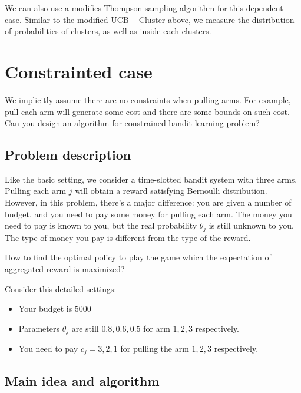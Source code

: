\documentclass[11pt]{article}
\providecommand{\tightlist}{%
      \setlength{\itemsep}{0pt}\setlength{\parskip}{0pt}}
\begin{document}
We can also use a modifies Thompson sampling algorithm for this
dependent-case. Similar to the modified \(\mathrm{UCB-Cluster}\) above, we
measure the distribution of probabilities of clusters, as well as inside
each clusters.
\pagebreak
    \hypertarget{constraint-sensitive-case}{%
\section{Constrainted case}\label{constraint-sensitive-case}}

We implicitly assume there are no constraints when pulling arms. For
example, pull each arm will generate some cost and there are some bounds
on such cost. Can you design an algorithm for constrained bandit
learning problem?

    \hypertarget{problem-description}{%
\subsection{Problem description}\label{problem-description}}

Like the basic setting, we consider a time-slotted bandit system with
three arms. Pulling each arm \(j\) will obtain a reward satisfying
Bernoulli distribution. However, in this problem, there's a major
difference: you are given a number of budget, and you need to pay some
money for pulling each arm. The money you need to pay is known to you,
but the real probability \(\theta_j\) is still unknown to you. The type
of money you pay is different from the type of the reward.

How to find the optimal policy to play the game which the expectation of
aggregated reward is maximized?

Consider this detailed settings:

\begin{itemize}
\tightlist
\item
  Your budget is \(5000\)
\item
  Parameters \(\theta_j\) are still \(0.8, 0.6, 0.5\) for arm \(1,2,3\)
  respectively.
\item
  You need to pay \(c_j = 3, 2, 1\) for pulling the arm \(1,2,3\)
  respectively.
\end{itemize}

\hypertarget{main-idea-and-algorithm}{%
\subsection{Main idea and algorithm}\label{main-idea-and-algorithm}}
\end{document}
